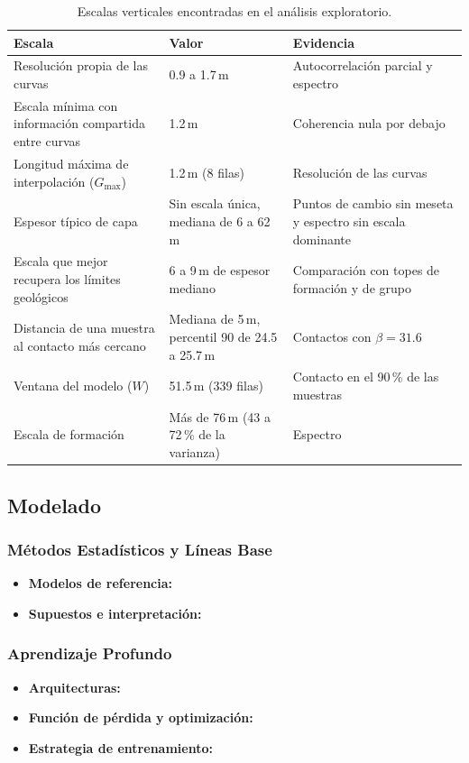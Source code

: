 \documentclass[11pt,a4paper]{article}
\begin{document}
\begin{table}[htbp]
\centering
\small
\caption{Escalas verticales encontradas en el análisis exploratorio.}
\label{tab:escala-vertical}
\begin{tabular}{p{5.2cm}p{4.2cm}p{4.8cm}}
\toprule
\textbf{Escala} & \textbf{Valor} & \textbf{Evidencia} \\
\midrule
Resolución propia de las curvas & 0.9 a 1.7\,m & Autocorrelación parcial y espectro \\
Escala mínima con información compartida entre curvas & 1.2\,m & Coherencia nula por debajo \\
Longitud máxima de interpolación ($G_{\max}$) & 1.2\,m (8 filas) & Resolución de las curvas \\
Espesor típico de capa & Sin escala única, mediana de 6 a 62\,m & Puntos de cambio sin meseta y espectro sin escala dominante \\
Escala que mejor recupera los límites geológicos & 6 a 9\,m de espesor mediano & Comparación con topes de formación y de grupo \\
Distancia de una muestra al contacto más cercano & Mediana de 5\,m, percentil 90 de 24.5 a 25.7\,m & Contactos con $\beta = 31.6$ \\
Ventana del modelo ($W$) & 51.5\,m (339 filas) & Contacto en el 90\,\% de las muestras \\
Escala de formación & Más de 76\,m (43 a 72\,\% de la varianza) & Espectro \\
\bottomrule
\end{tabular}
\end{table}

\subsection{Modelado}

\subsubsection{Métodos Estadísticos y Líneas Base}
\begin{itemize}
    \item \textbf{Modelos de referencia:}
    \item \textbf{Supuestos e interpretación:}
\end{itemize}

\subsubsection{Aprendizaje Profundo}
\begin{itemize}
    \item \textbf{Arquitecturas:}
    \item \textbf{Función de pérdida y optimización:}
    \item \textbf{Estrategia de entrenamiento:}
\end{itemize}
\end{document}
